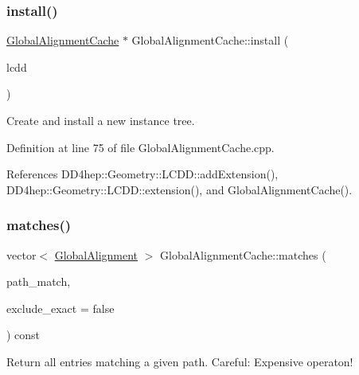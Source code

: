 \subsubsection{\texorpdfstring{install()}{install()}}
{\footnotesize\ttfamily \hyperlink{class_d_d4hep_1_1_alignments_1_1_global_alignment_cache}{Global\+Alignment\+Cache} $\ast$ Global\+Alignment\+Cache\+::install (\begin{DoxyParamCaption}\item[{\hyperlink{class_d_d4hep_1_1_geometry_1_1_l_c_d_d}{L\+C\+DD} \&}]{lcdd }\end{DoxyParamCaption})\hspace{0.3cm}{\ttfamily [static]}}



Create and install a new instance tree. 



Definition at line 75 of file Global\+Alignment\+Cache.\+cpp.



References D\+D4hep\+::\+Geometry\+::\+L\+C\+D\+D\+::add\+Extension(), D\+D4hep\+::\+Geometry\+::\+L\+C\+D\+D\+::extension(), and Global\+Alignment\+Cache().

\hypertarget{class_d_d4hep_1_1_alignments_1_1_global_alignment_cache_a13fc5a6b92fb8b9111c075a511850dcd}{}\label{class_d_d4hep_1_1_alignments_1_1_global_alignment_cache_a13fc5a6b92fb8b9111c075a511850dcd} 
\subsubsection{\texorpdfstring{matches()}{matches()}}
{\footnotesize\ttfamily vector$<$ \hyperlink{class_d_d4hep_1_1_alignments_1_1_global_alignment}{Global\+Alignment} $>$ Global\+Alignment\+Cache\+::matches (\begin{DoxyParamCaption}\item[{const std\+::string \&}]{path\+\_\+match,  }\item[{bool}]{exclude\+\_\+exact = {\ttfamily false} }\end{DoxyParamCaption}) const}



Return all entries matching a given path. Careful\+: Expensive operaton! 

